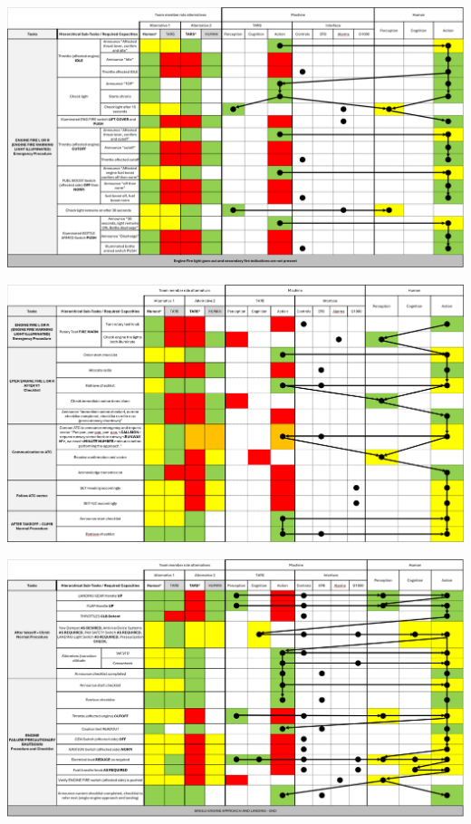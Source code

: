 \documentclass[12pt,a4paper]{article} %
\begin{document}
	\begin{table}[H]
		\centering
		\includegraphics[width=1\textwidth]{images/IA-table-3.png}
	\end{table}

	\begin{table}[H]
		\centering
		\includegraphics[width=1\textwidth]{images/IA-table-4.png}
	\end{table}

	\begin{table}[H]
		\centering
		\includegraphics[width=1\textwidth]{images/IA-table-5.png}
	\end{table}
\end{document}
